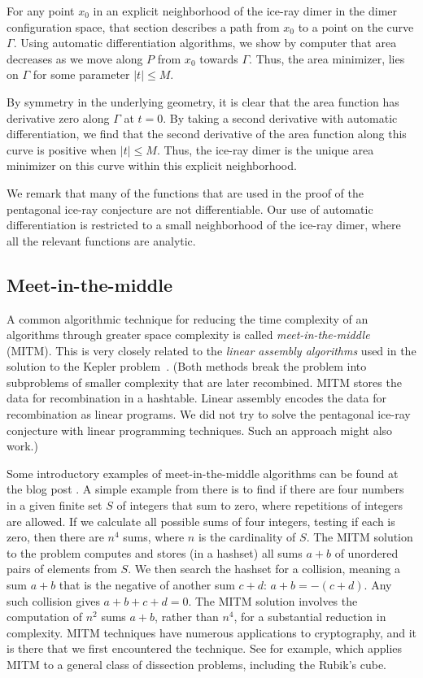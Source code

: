 For any point $x_0$ in an explicit neighborhood of the ice-ray dimer
in the dimer configuration space, that section describes a path from
$x_0$ to a point on the curve $\Gamma$.  Using automatic
differentiation algorithms, we show by computer that area decreases as
we move along $P$ from $x_0$ towards $\Gamma$.  Thus, the area
minimizer, lies on $\Gamma$ for some parameter $|t|\le M$.

By symmetry in the underlying geometry, it is clear that the area
function has derivative zero along $\Gamma$ at $t=0$. By taking a
second derivative with automatic differentiation, we find that the
second derivative of the area function along this curve is positive
when $|t|\le M$.  Thus, the ice-ray dimer is the unique area minimizer
on this curve within this explicit neighborhood.

We remark that many of the functions that are used in the proof of the
pentagonal ice-ray conjecture are not differentiable.  Our use of
automatic differentiation is restricted to a small neighborhood of the
ice-ray dimer, where all the relevant functions are analytic.

\subsection{Meet-in-the-middle}

A common algorithmic technique for reducing the time complexity of an
algorithms through greater space complexity is called {\it
  meet-in-the-middle} (MITM).  This is very closely related to the
{\it linear assembly algorithms} used in the solution to the Kepler
problem~\cite{hales2003some}. (Both methods break the problem into
subproblems of smaller complexity that are later recombined.  MITM
stores the data for recombination in a hashtable.  Linear assembly
encodes the data for recombination as linear programs.  We did not
try to solve the pentagonal ice-ray conjecture with linear programming
techniques. Such an approach might also work.)

Some introductory examples of meet-in-the-middle
algorithms can be found at the blog post \cite{mitm}.
A simple example from there is to find if there are four numbers in a
given finite set $S$ of integers that sum to zero, where repetitions
of integers are allowed.  If we calculate all possible sums of four
integers, testing if each is zero, then there are $n^4$ sums, where
$n$ is the cardinality of $S$.  The MITM solution to the problem
computes and stores (in a hashset) all sums $a+b$ of unordered pairs
of elements from $S$.  We then search the hashset for a collision,
meaning a sum $a+b$ that is the negative of another sum $c+d$: $a+b =
-(c+d)$.  Any such collision gives $a+b+c+d=0$.  The MITM solution
involves the computation of $n^2$ sums $a+b$, rather than $n^4$, for a
substantial reduction in complexity.  MITM techniques have numerous
applications to cryptography, and it is there that we first
encountered the technique.  See for example,
\cite{dinur2014dissection}
which applies MITM to a general class of dissection problems,
including the Rubik's cube.

